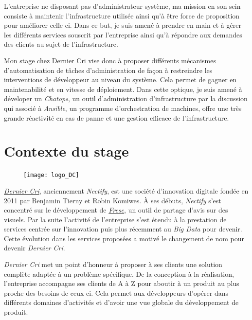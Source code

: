 \documentclass[12pt,a4paper]{article}
\begin{document}
  \bigskip

  L'entreprise ne disposant pas d'administrateur système, ma mission en
  son sein consiste à maintenir l'infrastructure utilisée ainsi qu'à être
  force de proposition pour améliorer celle-ci. Dans ce but, je suis amené
  à prendre en main et à gérer les différents services souscrit par
  l'entreprise ainsi qu'à répondre aux demandes des clients au sujet de
  l'infrastructure.

  \bigskip

  Mon stage chez Dernier Cri vise donc à proposer différents mécanismes
  d'automatisation de tâches d'administration de façon à restreindre les
  interventions de développeur au niveau du système. Cela permet de gagner
  en maintenabilité et en vitesse de déploiement. Dans cette optique, je
  suis amené à déveloper un \emph{Chatops}, un outil d'administration
  d'infrastructure par la discussion qui associé à \emph{Ansible}, un
  programme d'orchestration de machines, offre une très grande réactivité
  en cas de panne et une gestion efficace de l'infrastructure.

  \newpage

  \section{Contexte du stage}\label{contexte-du-stage}

  \begin{figure}[htbp]
  \centering
  \texttt{[image: logo\_DC]}
  \caption{}
  \end{figure}

  \emph{\href{http://derniercri.io}{Dernier Cri}}, anciennement
  \emph{Nectify}, est une société d'innovation digitale fondée en 2011 par
  Benjamin Tierny et Robin Komiwes. À ses débuts, \emph{Nectify} s'est
  concentré sur le développement de \emph{\href{http://fre.sc}{Fresc}}, un
  outil de partage d'avis sur des visuels. Par la suite l'activité de
  l'entreprise s'est étendu à la prestation de services centrée sur
  l'innovation puis plus récemment au \emph{Big Data} pour devenir. Cette
  évolution dans les services proposées a motivé le changement de nom pour
  devenir \emph{Dernier Cri}.

  \bigskip

  \emph{Dernier Cri} met un point d'honneur à proposer à ses clients une
  solution complète adaptée à un problème spécifique. De la conception à
  la réalisation, l'entreprise accompagne ses clients de A à Z pour
  aboutir à un produit au plus proche des besoins de ceux-ci. Cela permet
  aux développeurs d'opérer dans différents domaines d'activités et
  d'avoir une vue globale du développement de produit.
\end{document}
